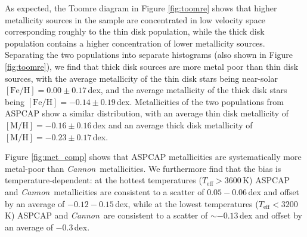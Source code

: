 \documentclass[twocolumn]{aastex62}
\newcommand{\cannon}{\textsl{Cannon}}
\newcommand{\teff}{T_{\mathrm{eff}}}
\newcommand{\feh}{[{\mathrm{Fe}/\mathrm{H}}]}
\newcommand{\mh}{[{\mathrm{M}/\mathrm{H}}]}
\begin{document}
As expected, the Toomre diagram in Figure \ref{fig:toomre} shows that higher metallicity sources in the sample are concentrated in low velocity space corresponding roughly to the thin disk population, while the thick disk population contains a higher concentration of lower metallicity sources. Separating the two populations into separate histograms (also shown in Figure \ref{fig:toomre}), we find that thick disk sources are more metal poor than thin disk sources, with the average metallicity of the thin disk stars being near-solar $\feh=0.00\pm0.17\,$dex, and the average metallicity of the thick disk stars being $\feh=-0.14\pm0.19\,$dex.
Metallicities of the two populations from ASPCAP show a similar distribution, with an average thin disk metallicity of $\mh=-0.16\pm0.16\,$dex and an average thick disk metallicity of $\mh=-0.23\pm0.17\,$dex.

Figure \ref{fig:met_comp} shows that ASPCAP metallicities are systematically more metal-poor than \cannon\ metallicities. We furthermore find that the bias is temperature-dependent: at the hottest temperatures ($\teff>3600\,$K) ASPCAP and \cannon\ metallicities are consistent to a scatter of $0.05-0.06\,$dex and offset by an average of $-0.12-0.15\,$dex, while at the lowest temperatures ($\teff<3200\,$K) ASPCAP and \cannon\ are consistent to a scatter of $\sim-0.13\,$dex and offset by an average of $-0.3\,$dex.


\end{document}
